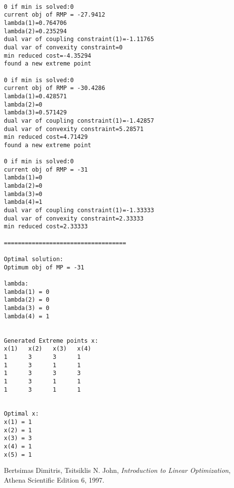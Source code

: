 \documentclass[twoside,12pt]{article}
\begin{document}
\begin{verbatim}

0 if min is solved:0
current obj of RMP = -27.9412
lambda(1)=0.764706
lambda(2)=0.235294
dual var of coupling constraint(1)=-1.11765
dual var of convexity constraint=0
min reduced cost=-4.35294
found a new extreme point

0 if min is solved:0
current obj of RMP = -30.4286
lambda(1)=0.428571
lambda(2)=0
lambda(3)=0.571429
dual var of coupling constraint(1)=-1.42857
dual var of convexity constraint=5.28571
min reduced cost=4.71429
found a new extreme point

0 if min is solved:0
current obj of RMP = -31
lambda(1)=0
lambda(2)=0
lambda(3)=0
lambda(4)=1
dual var of coupling constraint(1)=-1.33333
dual var of convexity constraint=2.33333
min reduced cost=2.33333

===================================

Optimal solution:
Optimum obj of MP = -31

lambda:
lambda(1) = 0
lambda(2) = 0
lambda(3) = 0
lambda(4) = 1


Generated Extreme points x:
x(1)   x(2)   x(3)   x(4)   
1      3      3      1      
1      3      1      1      
1      3      3      3      
1      3      1      1      
1      3      1      1      


Optimal x:
x(1) = 1
x(2) = 1
x(3) = 3
x(4) = 1
x(5) = 1
\end{verbatim}




\begin{thebibliography}{9}

  Bertsimas Dimitris, Tsitsiklis N. John,
  \emph{Introduction to Linear Optimization},
  Athena Scientific Edition 6,
  1997.

\end{thebibliography}
\end{document}
